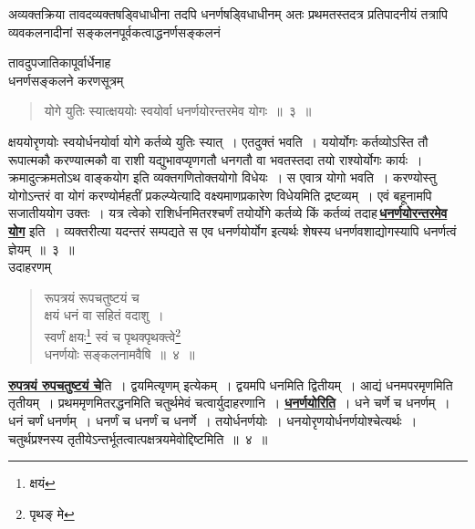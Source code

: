 \documentclass[11pt, openany]{book}
\begin{document}
\vspace{-4mm}
अव्यक्तक्रिया तावदव्यक्तषड्विधाधीना तदपि धनर्णषड्विधाधीनम् अतः प्रथमतस्तदत्र प्रतिपादनीयं तत्रापि व्यवकलनादीनां
सङ्कलनपूर्वकत्वाद्धनर्णसङ्कलनं

\newpage %

\noindent तावदुपजातिकापूर्वार्धेनाह\textemdash  \\

{\bqt धनर्णसङ्कलने करणसूत्रम्\textemdash }
 \label{3}
\begin{quote}
    \ab
 योगे युतिः स्यात्क्षययोः स्वयोर्वा धनर्णयोरन्तरमेव योगः~॥~३~॥
\end{quote}

क्षययोरृणयोः स्वयोर्धनयोर्वा योगे कर्तव्ये युतिः स्यात्~। एतदुक्तं
भवति~। ययोर्योगः कर्तव्योऽस्ति तौ रूपात्मकौ करण्यात्मकौ वा राशी
यद्युभावप्यृणगतौ धनगतौ वा भवतस्तदा तयो राश्योर्योगः कार्यः~।
क्रमादुत्क्रमतोऽथ वाङ्कयोग इति व्यक्तगणितोक्तयोगो विधेयः~। 
स एवात्र योगो भवति~। करण्योस्तु योगोऽन्तरं वा योगं करण्योर्महतीं
प्रकल्प्येत्यादि वक्ष्यमाणप्रकारेण विधेयमिति द्रष्टव्यम्~। 
एवं बहूनामपि सजातीययोग उक्तः~।
यत्र त्वेको राशिर्धनमितरश्चर्णं तयोर्योगे कर्तव्ये किं कर्तव्यं
तदाह\textendash \,\hyperref[3]{\textbf{धनर्णयोरन्तरमेव योग}} इति~। व्यक्तरीत्या यदन्तरं सम्पद्यते स एव
धनर्णयोर्योग इत्यर्थः शेषस्य धनर्णवशाद्योगस्यापि धनर्णत्वं ज्ञेयम्~॥~३~॥\\

\vspace{-2mm}
{\bqt उदाहरणम्\textendash }

 \label{4}
\begin{quote}
    {\eg
     रूपत्रयं रूपचतुष्टयं च \\
     क्षयं धनं वा सहितं वदाशु~।\\
 स्वर्णं क्षयः\renewcommand{\thefootnote}{1}\footnote{क्षयं} स्वं च पृथक्पृथक्त्वे\renewcommand{\thefootnote}{2}\footnote{पृथङ् मे} \\
 धनर्णयोः सङ्कलनामवैषि~॥~४~॥}
\end{quote}

\hyperref[4]{\textbf{रुपत्रयं रुपचतुष्टयं चे}}ति~। द्वयमित्यृणम् इत्येकम्~। द्वयमपि धनमिति
द्वितीयम्~। आद्यं धनमपरमृणमिति तृतीयम्~। प्रथममृणमितरद्धनमिति
चतुर्थमेवं चत्वार्युदाहरणानि~। \hyperref[3]{\textbf{धनर्णयोरिति}}~। धने चर्णे च धनर्णम्~। धनं चर्णं
धनर्णम्~। धनर्णं च धनर्णं च धनर्णे~। तयोर्धनर्णयोः~। धनयोरृणयोर्धनर्णयोश्चेत्यर्थः~। 
चतुर्थप्रश्नस्य तृतीयेऽन्तर्भूतत्वात्पक्षत्रयमेवोद्दिष्टमिति~॥~४~॥ \\
\end{document}
